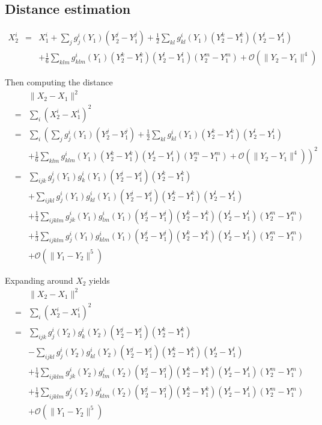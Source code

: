 \documentclass[12pt]{article}
\begin{document}
\subsection{Distance estimation}

\begin{eqnarray}
X_2^i &=& X_1^i + \sum_j g_j^i (Y_1) (Y^j_2 - Y^j_1 ) 
+ \frac{1}{2} \sum_{kl}  g^i_{kl} (Y_1) (Y^k_2 - Y^k_1)(Y^l_2 - Y^l_1) \\
&&+ \frac{1}{6} \sum_{klm}  g^i_{klm} (Y_1) (Y^k_2 - Y^k_1)(Y^l_2 - Y^l_1) (Y^m_2 - Y^m_1) 
+ \mathcal{O}( \|Y_2 - Y_1\|^4 )
\end{eqnarray}

Then computing the distance
\begin{eqnarray}
&&\| X_2 - X_1 \|^2 \\
&=&  \sum_i (X_2^i - X_1^i)^2 \\
&=& \sum_i  \left( \sum_j g_j^i (Y_1) (Y^j_2 - Y^j_1 )  \right.
+ \frac{1}{2} \sum_{kl}  g^i_{kl} (Y_1) (Y^k_2 - Y^k_1)(Y^l_2 - Y^l_1) \\
&&+ \left.  \frac{1}{6} \sum_{klm}  g^i_{klm} (Y_1) (Y^k_2 - Y^k_1)(Y^l_2 - Y^l_1) (Y^m_2 - Y^m_1) 
 + \mathcal{O}( \|Y_2 - Y_1\|^4 ) \right)^2 \\
&=& \sum_{ijk} g_j^i (Y_1) g_k^i (Y_1) (Y^j_2 - Y^j_1 ) (Y^k_2 - Y^k_1 ) \\
&& + \sum_{ijkl} g_j^i (Y_1) g^i_{kl} (Y_1) (Y^j_2 - Y^j_1 )  (Y^k_2 - Y^k_1)(Y^l_2 - Y^l_1) \\
&& + \frac{1}{4} \sum_{ijklm}  g^i_{jk} (Y_1) g^i_{lm} (Y_1) (Y^j_2 - Y^j_1) (Y^k_2 - Y^k_1) (Y^l_2 - Y^l_1) (Y^m_2 - Y^m_1) \\
&& + \frac{1}{3} \sum_{ijklm}  g^i_{j} (Y_1) g^i_{klm} (Y_1) (Y^j_2 - Y^j_1) (Y^k_2 - Y^k_1) (Y^l_2 - Y^l_1) (Y^m_2 - Y^m_1) \\
&& + \mathcal{O} (\|Y_1 - Y_2 \|^5 )
\end{eqnarray}

Expanding around $X_2$ yields
\begin{eqnarray}
&&\| X_2 - X_1 \|^2 \\
&=&  \sum_i (X_2^i - X_1^i)^2 \\
&=& \sum_{ijk} g_j^i (Y_2) g_k^i (Y_2) (Y^j_2 - Y^j_1 ) (Y^k_2 - Y^k_1 ) \\
&& - \sum_{ijkl} g_j^i (Y_2) g^i_{kl} (Y_2) (Y^j_2 - Y^j_1 )  (Y^k_2 - Y^k_1)(Y^l_2 - Y^l_1) \\
&& + \frac{1}{4} \sum_{ijklm}  g^i_{jk} (Y_2) g^i_{lm} (Y_2) (Y^j_2 - Y^j_1) (Y^k_2 - Y^k_1) (Y^l_2 - Y^l_1) (Y^m_2 - Y^m_1) \\
&& + \frac{1}{3} \sum_{ijklm}  g^i_{j} (Y_2) g^i_{klm} (Y_2) (Y^j_2 - Y^j_1) (Y^k_2 - Y^k_1) (Y^l_2 - Y^l_1) (Y^m_2 - Y^m_1) \\
&& + \mathcal{O} (\|Y_1 - Y_2 \|^5 )
\end{eqnarray}
\end{document}
